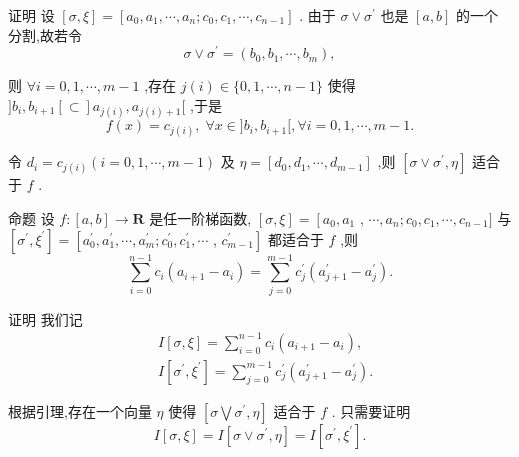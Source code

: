 证明 设 $\left\lbrack  {\sigma ,\xi }\right\rbrack   = \left\lbrack  {{a}_{0},{a}_{1},\cdots ,{a}_{n};{c}_{0},{c}_{1},\cdots ,{c}_{n - 1}}\right\rbrack$ . 由于 $\sigma  \vee  {\sigma }^{\prime }$ 也是 $\left\lbrack  {a,b}\right\rbrack$ 的一个分割,故若令
$$\sigma  \vee  {\sigma }^{\prime } = \left( {{b}_{0},{b}_{1},\cdots ,{b}_{m}}\right) ,$$

则 $\forall i = 0,1,\cdots ,m - 1$ ,存在 $j\left( i\right)  \in  \{ 0,1,\cdots ,n - 1\}$ 使得 $\rbrack {b}_{i},{b}_{i + 1}\left\lbrack   \subset  \right\rbrack  {a}_{j\left( i\right) },{a}_{j\left( i\right)  + 1}\lbrack$ ,于是
$$f\left( x\right)  = {c}_{j\left( i\right) },\;\forall x \in  \rbrack {b}_{i},{b}_{i + 1}\lbrack ,\forall i = 0,1,\cdots ,m - 1.$$

令 ${d}_{i} = {c}_{j\left( i\right) }\left( {i = 0,1,\cdots ,m - 1}\right)$ 及 $\eta  = \left\lbrack  {{d}_{0},{d}_{1},\cdots ,{d}_{m - 1}}\right\rbrack$ ,则 $\left\lbrack  {\sigma  \vee  {\sigma }^{\prime },\eta }\right\rbrack$ 适合于 $f$ .

命题 设 $f : \left\lbrack  {a,b}\right\rbrack   \rightarrow  \mathbf{R}$ 是任一阶梯函数, $\left\lbrack  {\sigma ,\xi }\right\rbrack   = \left\lbrack  {{a}_{0},{a}_{1}}\right.$ , $\cdots ,{a}_{n};{c}_{0},{c}_{1},\cdots ,{c}_{n - 1}\rbrack$ 与 $\left\lbrack  {{\sigma }^{\prime },{\xi }^{\prime }}\right\rbrack   = \left\lbrack  {{a}_{0}^{\prime },{a}_{1}^{\prime },\cdots ,{a}_{m}^{\prime };{c}_{0}^{\prime },{c}_{1}^{\prime },\cdots }\right.$ , $\left. {c}_{m - 1}^{\prime }\right\rbrack$ 都适合于 $f$ ,则
$$\mathop{\sum }\limits_{{i = 0}}^{{n - 1}}{c}_{i}\left( {{a}_{i + 1} - {a}_{i}}\right)  = \mathop{\sum }\limits_{{j = 0}}^{{m - 1}}{c}_{j}^{\prime }\left( {{a}_{j + 1}^{\prime } - {a}_{j}^{\prime }}\right) .$$

证明 我们记
\begin{align*}
	&I\left\lbrack  {\sigma ,\xi }\right\rbrack   = \mathop{\sum }\limits_{{i = 0}}^{{n - 1}}{c}_{i}\left( {{a}_{i + 1} - {a}_{i}}\right) ,\\
	&I\left\lbrack  {{\sigma }^{\prime },{\xi }^{\prime }}\right\rbrack   = \mathop{\sum }\limits_{{j = 0}}^{{m - 1}}{c}_{j}^{\prime }\left( {{a}_{j + 1}^{\prime } - {a}_{j}^{\prime }}\right) .
\end{align*}

根据引理,存在一个向量 $\eta$ 使得 $\left\lbrack  {\sigma \bigvee {\sigma }^{\prime },\eta }\right\rbrack$ 适合于 $f$ . 只需要证明
$$I\left\lbrack  {\sigma ,\xi }\right\rbrack   = I\left\lbrack  {\sigma  \vee  {\sigma }^{\prime },\eta }\right\rbrack   = I\left\lbrack  {{\sigma }^{\prime },{\xi }^{\prime }}\right\rbrack  .$$

